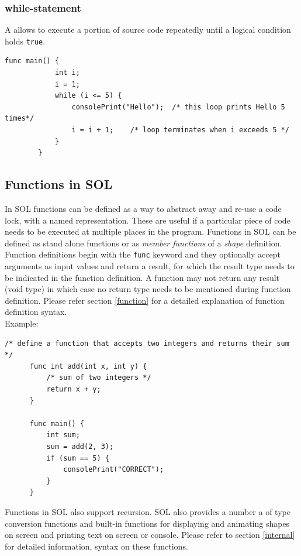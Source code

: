 \documentclass[letterpaper,12pt]{report}
\begin{document}
      \subsubsection{while-statement}
      A  allows to execute a portion of source code repeatedly until a logical condition holds \texttt{true}.
      \begin{lstlisting}[style=sol]
        func main() {
            int i;
            i = 1;
            while (i <= 5) {
                consolePrint("Hello");  /* this loop prints Hello 5 times*/
                i = i + 1;    /* loop terminates when i exceeds 5 */
            }
        }
      \end{lstlisting}

    \subsection{Functions in SOL}
    In SOL functions can be defined as a way to abstract away and re-use a code lock, with a named representation. These are useful if a particular piece of code needs to be executed at multiple places in the program. Functions in SOL can be defined as stand alone functions or as \textit{member functions} of a \textit{shape} definition. Function definitions begin with the \texttt{func} keyword and they optionally accept arguments as input values and return a result, for which the result type needs to be indicated in the function definition. A function may not return any result (void type) in which case no return type needs to be mentioned during function definition. Please refer section \ref{function} for a detailed explanation of function definition syntax.\\
    
    Example:\\
    \begin{lstlisting}[style=sol]
      /* define a function that accepts two integers and returns their sum */
      func int add(int x, int y) {
          /* sum of two integers */
          return x + y;
      }

      func main() {
          int sum;
          sum = add(2, 3);
          if (sum == 5) {
              consolePrint("CORRECT");
          }
      }
    \end{lstlisting}

    Functions in SOL also support recursion. SOL also provides a number a of type conversion functions and built-in functions for displaying and animating shapes on screen and printing text on screen or console. Please refer to section \ref{internal} for detailed information, syntax on these functions.
\end{document}
